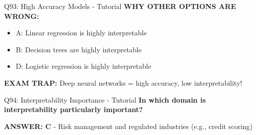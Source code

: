 \documentclass[8pt]{beamer}
\begin{document}
\begin{frame}{Q93: High Accuracy Models - Tutorial}
		\vspace{0.05cm}
		\textcolor{myred}{\textbf{WHY OTHER OPTIONS ARE WRONG:}}
		\begin{itemize}
			\item \textcolor{myred}{A:} Linear regression is highly interpretable
			\item \textcolor{myred}{B:} Decision trees are highly interpretable
			\item \textcolor{myred}{D:} Logistic regression is highly interpretable
		\end{itemize}
		
		\textcolor{myred}{\textbf{EXAM TRAP:}} Deep neural networks = high accuracy, low interpretability!
	\end{frame}
	
	\begin{frame}{Q94: Interpretability Importance - Tutorial}
		\fontsize{6.5}{7.5}\selectfont
		\textbf{In which domain is interpretability particularly important?}
		
		\vspace{0.05cm}
		\textcolor{myblue}{\textbf{ANSWER: C}} - Risk management and regulated industries (e.g., credit scoring)
		

\end{frame}
\end{document}
